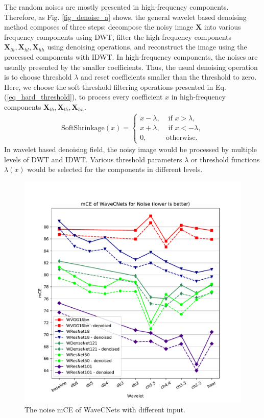 The random noises are mostly presented in high-frequency components.
Therefore, as Fig. \ref{fig_denoise_a} shows,
the general wavelet based denoising method \cite{donoho1995noising,donoho1994ideal} composes of three steps:
decompose the noisy image $\textbf{X}$ into various frequency components using DWT,
filter the high-frequency components $\textbf{X}_{lh}, \textbf{X}_{hl}, \textbf{X}_{hh}$ using denoising operations,
and reconstruct the image using the processed components with IDWT.
In high-frequency components, the noises are usually presented by the smaller coefficients.
Thus, the usual denoising operation is to choose threshold $\lambda$ and reset coefficients smaller than the threshold to zero.
Here, we choose the soft threshold filtering operations presented in Eq. (\ref{eq_hard_threshold}),
to process every coefficient $x$ in high-frequency components $\textbf{X}_{lh}, \textbf{X}_{lh}, \textbf{X}_{hh}$.
\begin{align}
\label{eq_hard_threshold}
\text{SoftShrinkage}(x) = \begin{cases}
        x - \lambda, & \text{ if } x > \lambda, \\
        x + \lambda, & \text{ if } x < -\lambda, \\
        0, & \text{otherwise}.
        \end{cases}
\end{align}
In wavelet based denoising field, the noisy image would be processed by multiple levels of DWT and IDWT.
Various threshold parameters $\lambda$ or threshold functions $\lambda(x)$ would be selected for the components in different levels.
\begin{figure}[bpt]
	\centering
	\includegraphics*[scale=0.5, viewport=35 21 490 505]{figures/mCE_noise_denoise_new.pdf}
	\caption{The noise mCE of WaveCNets with different input.}
	\label{fig_mCE_noise_denoise}
\end{figure}

